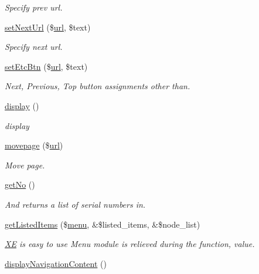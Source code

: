 \begin{DoxyCompactItemize}
\begin{DoxyCompactList}\small\item\em Specify prev url. \end{DoxyCompactList}\item 
\hyperlink{classmobileXE_a6c9c99c3df5a9345485026c74a796287}{set\+Next\+Url} (\$\hyperlink{swfupload_8js_a440a52a9004fdab0700100a6ddb49f67}{url}, \$text)
\begin{DoxyCompactList}\small\item\em Specify next url. \end{DoxyCompactList}\item 
\hyperlink{classmobileXE_aed1255190e5d085529facbc6f5e79335}{set\+Etc\+Btn} (\$\hyperlink{swfupload_8js_a440a52a9004fdab0700100a6ddb49f67}{url}, \$text)
\begin{DoxyCompactList}\small\item\em Next, Previous, Top button assignments other than. \end{DoxyCompactList}\item 
\hyperlink{classmobileXE_aff665dae76909bd7876038802e4d001f}{display} ()
\begin{DoxyCompactList}\small\item\em display \end{DoxyCompactList}\item 
\hyperlink{classmobileXE_aed0ec3795acddd89572e740d3b31c806}{movepage} (\$\hyperlink{swfupload_8js_a440a52a9004fdab0700100a6ddb49f67}{url})
\begin{DoxyCompactList}\small\item\em Move page. \end{DoxyCompactList}\item 
\hyperlink{classmobileXE_aea159c7670d0d25f3c770672f3dd0e66}{get\+No} ()
\begin{DoxyCompactList}\small\item\em And returns a list of serial numbers in. \end{DoxyCompactList}\item 
\hyperlink{classmobileXE_a482a65d3f684a18d5769f9951ac2741e}{get\+Listed\+Items} (\$\hyperlink{classmenu}{menu}, \&\$listed\+\_\+items, \&\$node\+\_\+list)
\begin{DoxyCompactList}\small\item\em \hyperlink{namespaceXE}{XE} is easy to use Menu module is relieved during the function, value. \end{DoxyCompactList}\item 
\hyperlink{classmobileXE_a76d2b1e71a4146580ebfae85f02d9644}{display\+Navigation\+Content} ()

\end{DoxyCompactItemize}
